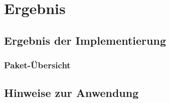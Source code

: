 
\chapter{Ergebnis}

\section{Ergebnis der Implementierung}

\subsection{Paket-Übersicht}

\section{Hinweise zur Anwendung}